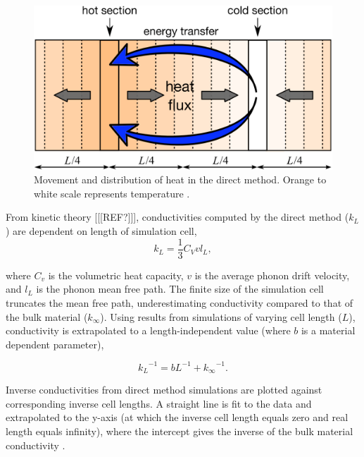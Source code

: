 \begin{figure}[h]
  \includegraphics[width=\linewidth]{Figures/ss_direct_mod.png}
  \caption{Movement and distribution of heat in the direct method. Orange to white scale represents temperature \citep[modified from][]{Stackhouse2015}.}
  \label{fig:ss_direct}
\end{figure}

From kinetic theory [[[REF?]]], conductivities computed by the direct method ($k_L$) are dependent on length of simulation cell,
\begin{equation}
k_{L} = \frac{1}{3} C_{V} v l_{L} \label{length-dep},
\end{equation}

where $C_v$ is the volumetric heat capacity, $v$ is the average phonon drift velocity, and $l_L$ is the phonon mean free path. The finite size of the simulation cell truncates the mean free path, underestimating conductivity compared to that of the bulk material ($k_\infty$). Using results from simulations of varying cell length ($L$), conductivity is extrapolated to a length-independent value (where $b$ is a material dependent parameter),

\begin{equation}
{k_{L}}^{-1} = b L^{-1} + {k_{\infty}}^{-1} \label{linear-extrap}.
\end{equation}

Inverse conductivities from direct method simulations are plotted against corresponding inverse cell lengths. A straight line is fit to the data and extrapolated to the y-axis (at which the inverse cell length equals zero and real length equals infinity), where the intercept gives the inverse of the bulk material conductivity \citep{Schelling2002}.

